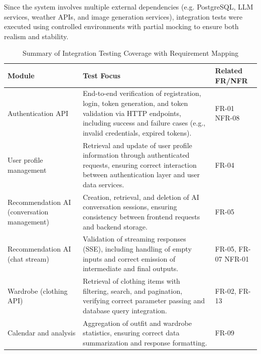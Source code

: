 Since the system involves multiple external dependencies (e.g. PostgreSQL, LLM services, weather APIs, and image generation services), integration tests were executed using controlled environments with partial mocking to ensure both realism and stability.
\begin{table}[H]
\centering
\caption{Summary of Integration Testing Coverage with Requirement Mapping}
\label{integration_test_table}
\renewcommand{\arraystretch}{1.2}
\begin{tabular}{p{3.2cm} p{8.8cm} p{2.2cm}}
\toprule
\textbf{Module} & \textbf{Test Focus} & \textbf{Related FR/NFR} \\
\midrule

Authentication API 
& End-to-end verification of registration, login, token generation, and token validation via HTTP endpoints, including success and failure cases (e.g., invalid credentials, expired tokens). 
& FR-01 \newline NFR-08 \\

\addlinespace

User profile management 
& Retrieval and update of user profile information through authenticated requests, ensuring correct interaction between authentication layer and user data services. 
& FR-04 \\

\addlinespace

Recommendation AI (conversation management) 
& Creation, retrieval, and deletion of AI conversation sessions, ensuring consistency between frontend requests and backend storage. 
& FR-05 \\

\addlinespace

Recommendation AI (chat stream) 
& Validation of streaming responses (SSE), including handling of empty inputs and correct emission of intermediate and final outputs. 
& FR-05, FR-07 \newline NFR-01 \\

\addlinespace

Wardrobe (clothing API) 
& Retrieval of clothing items with filtering, search, and pagination, verifying correct parameter passing and database query integration. 
& FR-02, FR-13 \\

\addlinespace

Calendar and analysis 
& Aggregation of outfit and wardrobe statistics, ensuring correct data summarization and response formatting. 
& FR-09 \\


\end{tabular}
\end{table}
